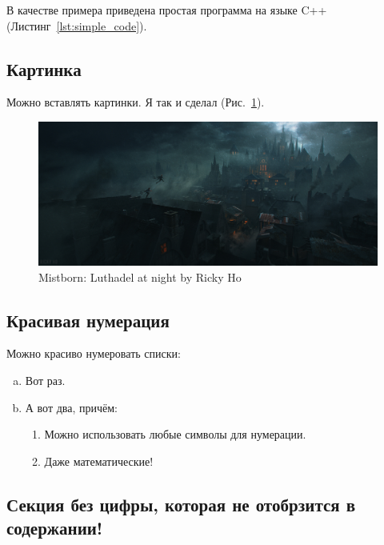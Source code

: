 В качестве примера приведена простая программа на языке C++ (Листинг~\ref{lst:simple_code}).
\label{lst:simple_code}

\newpage

\subsection{Картинка}

Можно вставлять картинки. Я так и сделал (Рис.~\ref{pic:luthadel}).
\begin{figure}[!h]
	\centering
	\includegraphics[width=1.0\textwidth]{pic/ricky-ho-mistborn-luthadel-city-rickyho}
	\caption{Mistborn: Luthadel at night by Ricky Ho}
	\label{pic:luthadel}
\end{figure}


\subsection{Красивая нумерация}

Можно красиво нумеровать списки:

\begin{enumerate}[(a)]
    \item Вот раз.
    \item А вот два, причём:
    \begin{enumerate}[1 $\to$]
    	\item Можно использовать любые символы для нумерации.
    	\item Даже математические!
    \end{enumerate}
\end{enumerate}


\subsection*{Секция без цифры, которая не отобрзится в содержании!}

